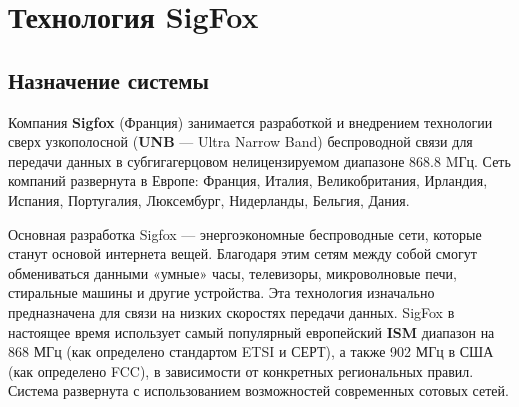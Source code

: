 \section{Технология SigFox}
\subsection{Назначение системы}
Компания \textbf{Sigfox} (Франция) занимается разработкой и внедрением технологии сверх узкополосной (\textbf{UNB} — Ultra Narrow Band) беспроводной связи для передачи данных в субгигагерцовом нелицензируемом диапазоне 868.8 MГц. Сеть компаний развернута в Европе: Франция, Италия, Великобритания, Ирландия, Испания, Португалия, Люксембург, Нидерланды, Бельгия, Дания. 

Основная разработка Sigfox — энергоэкономные беспроводные сети, которые станут основой интернета вещей. Благодаря этим сетям между собой смогут обмениваться данными «умные» часы, телевизоры, микроволновые печи, стиральные машины и другие устройства. Эта технология изначально предназначена для связи на низких скоростях передачи данных. SigFox в настоящее время использует самый популярный европейский \textbf{ISM} диапазон на 868 МГц (как определено стандартом ETSI и СЕРТ), а также 902 МГц в США (как определено FCC), в зависимости от конкретных региональных правил. Система развернута с использованием возможностей современных сотовых сетей.
